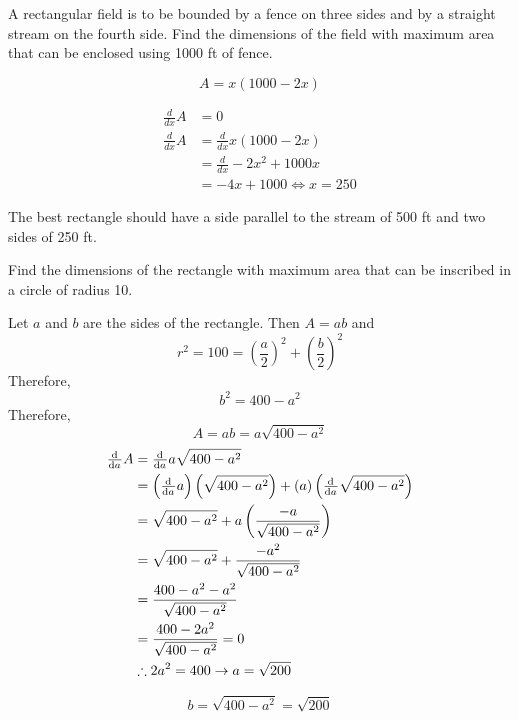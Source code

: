 \documentclass[a4paper, titlepage]{article}
\begin{document}
\begin{Exercise}
A rectangular field is to be bounded by a fence on three sides
and by a straight stream on the fourth side.
Find the dimensions of the field with maximum area that can be enclosed
using 1000 ft of fence.
\cite{anton-bivens-davis}
\end{Exercise}

\begin{Answer}
\[A = x \left( 1000 - 2x \right)\]

\begin{align*}
    \frac{d}{dx} A &= 0 \\
    \frac{d}{dx} A &= \frac{d}{dx} x \left( 1000 - 2x \right) \\
    &= \frac{d}{dx} -2x^2 + 1000x \\
    &= -4x + 1000
    \iff x = 250
\end{align*}

The best rectangle should have a side parallel to the stream of 500 ft
and two sides of 250 ft.
\end{Answer}

\begin{Exercise}
Find the dimensions of the rectangle with maximum area
that can be inscribed in a circle of radius 10.
\cite{anton-bivens-davis}
\end{Exercise}

\begin{Answer}
Let \(a\) and \(b\) are the sides of the rectangle. Then \(A = ab\) and
\[r^2 = 100 = \left( \frac{a}{2} \right)^2 + \left( \frac{b}{2} \right)^2\]
Therefore,
\[b^2 = 400 - a^2\]
Therefore,
\[A = ab = a \sqrt{400 - a^2}\]
\begin{align*}
    \od{}{a} A &= \od{}{a} a \sqrt{400 - a^2} \\
    &= \left( \od{}{a} a \right) \left( \sqrt{400 - a^2} \right)
      + \left( a \right) \left( \od{}{a} \sqrt{400 - a^2} \right) \\
    &= \sqrt{400 - a^2} + a \left(\frac{-a}{\sqrt{400 - a^2}} \right) \\
    &= \sqrt{400 - a^2} + \frac{-a^2}{\sqrt{400 - a^2}} \\
    &= \frac{400 - a^2 - a^2}{\sqrt{400 - a^2}} \\
    &= \frac{400 - 2a^2}{\sqrt{400 - a^2}} = 0 \\
    &\therefore 2a^2 = 400 \rightarrow a = \sqrt{200} \\
\end{align*}

\[b = \sqrt{400 - a^2} = \sqrt{200}\]
\end{Answer}
\end{document}

